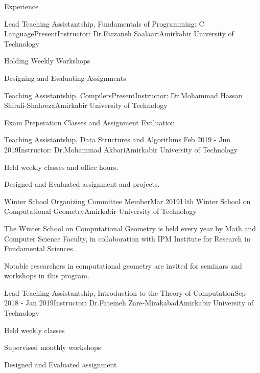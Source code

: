 \documentclass{resume} %
\begin{document}
	\begin{rSection}{Experience}
		\begin{rSubsection}{Lead Teaching Assistantship, Fundamentals of Programming: C Language}{Present}{Instructor: Dr.Farzaneh Saalaari}{Amirkabir University of Technology}
		\item Holding Weekly Workshops
		\item Designing and Evaluating Assignments
		
		\end{rSubsection}					%
		\begin{rSubsection}{Teaching Assistantship, Compilers}{Present}{Instructor: Dr.Mohammad Hassan Shirali-Shahreza}{Amirkabir University of Technology}
		\item Exam Preperation Classes and Assignment Evaluation
		\end{rSubsection}					%
		\begin{rSubsection}{Teaching Assistantship, Data Structures and Algorithms }{Feb 2019 - Jun 2019}{Instructor: Dr.Mohammad Akbari}{Amirkabir University of Technology}
			\item 
			Held weekly classes and office hours.
			\item 
			Designed and Evaluated assignment and projects.
		\end{rSubsection}
		\begin{rSubsection}{Winter School Organizing Committee Member}{Mar 2019}{11th Winter School on Computational Geometry}{Amirkabir University of Technology}
			\item 	The Winter School on Computational Geometry is held every year by Math and Computer Science Faculty, in collaboration with IPM Institute for Research in Fundamental Sciences.
			\item Notable researchers in computational geometry are invited for seminars and workshops in this program.
		\end{rSubsection}
		
		
		
		\begin{rSubsection}{Lead Teaching Assistantship, Introduction to the Theory of Computation}{Sep 2018 - Jan 2019}{Instructor: Dr.Fatemeh Zare-Mirakabad}{Amirkabir University of Technology}
			\item Held weekly classes 
			\item Supervised monthly workshops
			\item Designed and Evaluated assignment 
			

\end{rSubsection}
\end{rSection}
\end{document}
